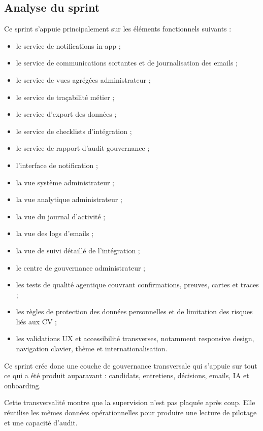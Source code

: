 \subsection{Analyse du sprint}
Ce sprint s'appuie principalement sur les éléments fonctionnels suivants :
\begin{itemize}
  \item le service de notifications in-app ;
  \item le service de communications sortantes et de journalisation des emails ;
  \item le service de vues agrégées administrateur ;
  \item le service de traçabilité métier ;
  \item le service d'export des données ;
  \item le service de checklists d'intégration ;
  \item le service de rapport d'audit gouvernance ;
  \item l'interface de notification ;
  \item la vue système administrateur ;
  \item la vue analytique administrateur ;
  \item la vue du journal d'activité ;
  \item la vue des logs d'emails ;
  \item la vue de suivi détaillé de l'intégration ;
  \item le centre de gouvernance administrateur ;
  \item les tests de qualité agentique couvrant confirmations, preuves, cartes et traces ;
  \item les règles de protection des données personnelles et de limitation des risques liés aux CV ;
  \item les validations UX et accessibilité transverses, notamment responsive design, navigation clavier, thème et internationalisation.
\end{itemize}

Ce sprint crée donc une couche de gouvernance transversale qui s'appuie sur tout ce qui a été produit auparavant : candidats, entretiens, décisions, emails, IA et onboarding.

Cette transversalité montre que la supervision n'est pas plaquée après coup. Elle réutilise les mêmes données opérationnelles pour produire une lecture de pilotage et une capacité d'audit.

